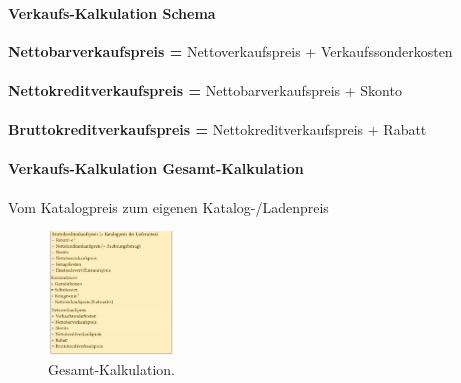 \documentclass[../ZF_Wing.tex]{subfiles}
\begin{document}
\paragraph{\colorbox{orange!30}{Verkaufs-Kalkulation Schema}\\}


\textbf{Nettobarverkaufspreis =} Nettoverkaufspreis + Verkaufssonderkosten\\
\\
\textbf{Nettokreditverkaufspreis =} Nettobarverkaufspreis + Skonto\\
\\
\textbf{Bruttokreditverkaufspreis =} Nettokreditverkaufspreis + Rabatt\\

\paragraph{\colorbox{orange!30}{Verkaufs-Kalkulation Gesamt-Kalkulation}\\}

Vom Katalogpreis zum eigenen Katalog-/Ladenpreis\\

\begin{figure}[H]
\centering
\includegraphics[width=0.3\textwidth]{Resources/Image/Gesamt-Kalkulation.png}
\caption{\label{fig:Gesamt-Kalkulation}Gesamt-Kalkulation.}
\end{figure}
\end{document}

